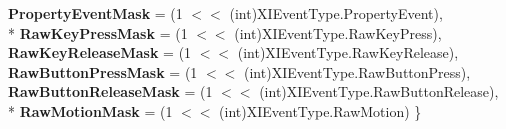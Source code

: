 \begin{DoxyCompactItemize}
{\bfseries Property\-Event\-Mask} = (1 $<$$<$ (int)X\-I\-Event\-Type.\-Property\-Event), 
\\*
{\bfseries Raw\-Key\-Press\-Mask} = (1 $<$$<$ (int)X\-I\-Event\-Type.\-Raw\-Key\-Press), 
{\bfseries Raw\-Key\-Release\-Mask} = (1 $<$$<$ (int)X\-I\-Event\-Type.\-Raw\-Key\-Release), 
{\bfseries Raw\-Button\-Press\-Mask} = (1 $<$$<$ (int)X\-I\-Event\-Type.\-Raw\-Button\-Press), 
{\bfseries Raw\-Button\-Release\-Mask} = (1 $<$$<$ (int)X\-I\-Event\-Type.\-Raw\-Button\-Release), 
\\*
{\bfseries Raw\-Motion\-Mask} = (1 $<$$<$ (int)X\-I\-Event\-Type.\-Raw\-Motion)
 \}
\end{DoxyCompactItemize}
